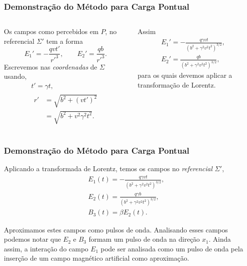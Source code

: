 \documentclass[xcolor=dvipsnames]{beamer}
\begin{document}
\begin{frame}
	\frametitle{Demonstração do Método para Carga Pontual}
	\begin{columns}

		Os campos como percebidos em $P$, no referencial $\Sigma '$ tem a forma
		\begin{equation}
			E_1 ' = -\frac{qvt'}{{r'} ^3}, \qquad E_2 ' = \frac{qb}{{r'}^3}.
		\end{equation}
		Escrevemos nas \textit{coordenadas} de $\Sigma$ usando,
		\begin{gather}
			t' = \gamma t, \\
			\begin{split}
			r ' &= \sqrt{b^2 + (v t')^2} \\
				&= \sqrt{b^2 + v^2 \gamma ^2 t^2}.
			\end{split}
		\end{gather}

		Assim
		\begin{gather}
			E _1 '= - \frac{q\gamma vt}{(b^2 + \gamma ^2 v^2 t^2)^{3/2}},\\
			E _2 '= \frac{qb}{(b^2 + \gamma ^2 v^2 t^2)^{3/2}},
		\end{gather}
		para os quais devemos aplicar a transformação de Lorentz.
	\end{columns}
\end{frame}

\begin{frame}
	\frametitle{Demonstração do Método para Carga Pontual}
	Aplicando a transformada de Lorentz, temos os campos no \textit{referencial}
	$\Sigma '$,
	\begin{gather}
		E_1 (t) = -\frac{q\gamma vt}{(b^2 + \gamma ^2 v^2t^2)^{3/2}}
			\label{eq_field1},\\
		E_2 (t) = \frac{q\gamma b}{(b^2 + \gamma ^2 v^2 t
			^2)^{3/2}}\label{eq_field2},\\ 
		B_3 (t) = \beta E_2(t) \label{eq_field3}.
	\end{gather}
	\begin{block}{Aproximamos estes campos como pulsos de onda.}
		Analisando esses campos podemos notar que $E_2$ e $B_3$ formam um pulso
		de onda na direção $x_1$. Ainda assim, a interação do campo $E_1$ pode
		ser analisada como um pulso de onda pela inserção de um campo magnético
		artificial como aproximação.
	\end{block}
\end{frame}
\end{document}
